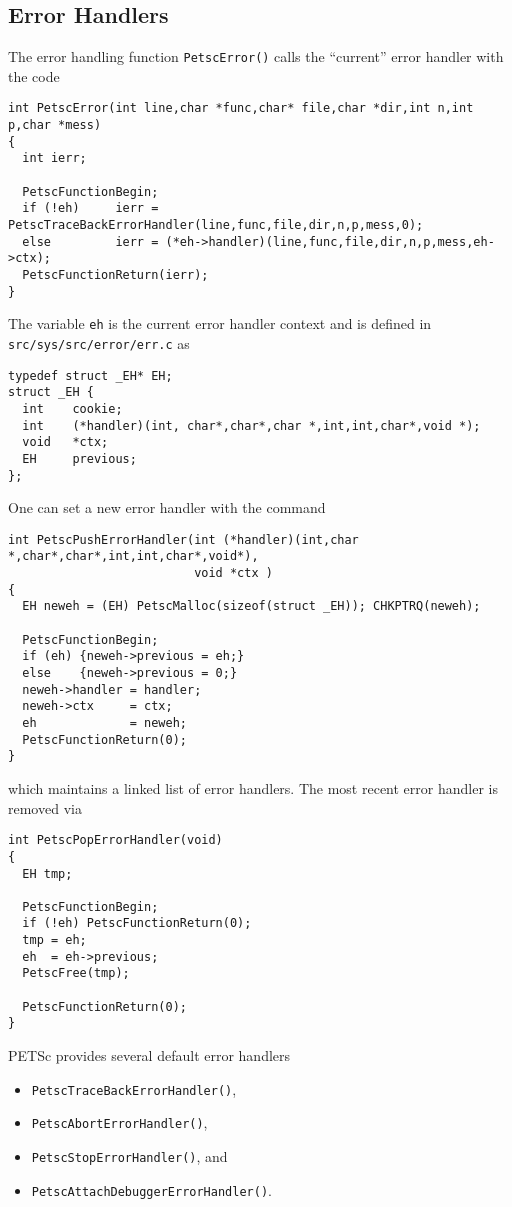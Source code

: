 \documentclass[twoside,12pt]{../sty/report_petsc}
\begin{document}
\subsection{Error Handlers}
The error handling function {\tt PetscError()} calls the ``current'' error handler
with the code
\begin{verbatim}
int PetscError(int line,char *func,char* file,char *dir,int n,int p,char *mess)
{
  int ierr;

  PetscFunctionBegin;
  if (!eh)     ierr = PetscTraceBackErrorHandler(line,func,file,dir,n,p,mess,0);
  else         ierr = (*eh->handler)(line,func,file,dir,n,p,mess,eh->ctx);
  PetscFunctionReturn(ierr);
}
\end{verbatim}
The variable {\tt eh} is the current error handler context and is defined in 
{\tt src/sys/src/error/err.c} as
\begin{verbatim}
typedef struct _EH* EH;
struct _EH {
  int    cookie;
  int    (*handler)(int, char*,char*,char *,int,int,char*,void *);
  void   *ctx;
  EH     previous;
};
\end{verbatim}

One can set a new error handler with the command 
\begin{verbatim}
int PetscPushErrorHandler(int (*handler)(int,char *,char*,char*,int,int,char*,void*),
                          void *ctx )
{
  EH neweh = (EH) PetscMalloc(sizeof(struct _EH)); CHKPTRQ(neweh);

  PetscFunctionBegin;
  if (eh) {neweh->previous = eh;} 
  else    {neweh->previous = 0;}
  neweh->handler = handler;
  neweh->ctx     = ctx;
  eh             = neweh;
  PetscFunctionReturn(0);
}
\end{verbatim}
which maintains a linked list of error handlers. The most recent error handler is removed
via
\begin{verbatim}
int PetscPopErrorHandler(void)
{
  EH tmp;

  PetscFunctionBegin;
  if (!eh) PetscFunctionReturn(0);
  tmp = eh;
  eh  = eh->previous;
  PetscFree(tmp);

  PetscFunctionReturn(0);
}
\end{verbatim}

PETSc provides several default error handlers
\begin{itemize}
\item {\tt PetscTraceBackErrorHandler()},
\item {\tt PetscAbortErrorHandler()}, 
\item {\tt PetscStopErrorHandler()}, and
\item {\tt PetscAttachDebuggerErrorHandler()}. 
\end{itemize}
\end{document}
